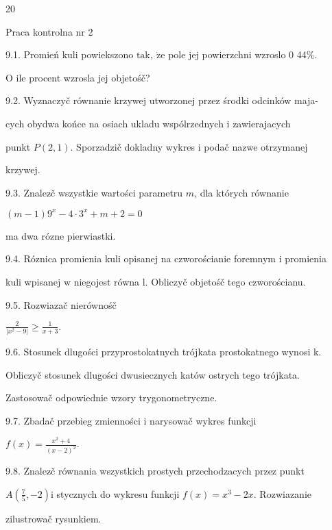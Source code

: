\documentclass[a4paper,12pt]{article}
\begin{document}
20

Praca kontrolna nr 2

9.1. Promień kuli powiekszono $\mathrm{t}\mathrm{a}\mathrm{k},\ \dot{\mathrm{z}}\mathrm{e}$ pole jej powierzchni wzroslo $0$ 44\%.

$\mathrm{O}$ ile procent wzrosla jej objetośč?

9.2. Wyznaczyč równanie krzywej utworzonej przez środki odcinków maja-

cych obydwa końce na osiach ukladu wspólrzednych $\mathrm{i}$ zawierajacych

punkt $P(2,1)$. Sporzadzič dokladny wykres $\mathrm{i}$ podač nazwe otrzymanej

krzywej.

9.3. Znalez$\acute{}$č wszystkie wartości parametru $m$, dla których równanie

$(m-1)9^{x}-4\cdot 3^{x}+m+2=0$

ma dwa rózne pierwiastki.

9.4. Róznica promienia kuli opisanej na czworościanie foremnym $\mathrm{i}$ promienia

kuli wpisanej $\mathrm{w}$ niegojest równa l. Obliczyč objetośč tego czworościanu.

9.5. Rozwiazač nierównośč

$\displaystyle \frac{2}{|x^{2}-9|}\geq\frac{1}{x+3}.$

9.6. Stosunek dlugości przyprostokatnych trójkata prostokatnego wynosi k.

Obliczyč stosunek dlugości dwusiecznych katów ostrych tego trójkata.

Zastosowač odpowiednie wzory trygonometryczne.

9.7. Zbadač przebieg zmienności i narysowač wykres funkcji

$f(x)=\displaystyle \frac{x^{2}+4}{(x-2)^{2}}.$

9.8. Znalez$\acute{}$č równania wszystkich prostych przechodzacych przez punkt

$A(\displaystyle \frac{7}{5},-2)\mathrm{i}$ stycznych do wykresu funkcji $f(x)=x^{3}-2x$. Rozwiazanie

zilustrowač rysunkiem.
\end{document}
